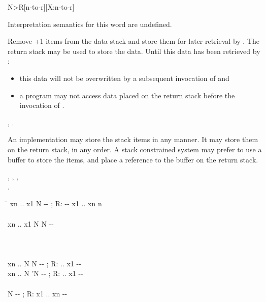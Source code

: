\begin{worddef*}[NtoR]{}{N>R}[n-to-r][X:n-to-r]

\interpret
	Interpretation semantics for this word are undefined.

\execute {} 

	Remove +1 items from the data stack and store them for later
	retrieval by . The return stack may be used to store the
	data. Until this data has been retrieved by :
	\begin{itemize}
	\item this data will not be overwritten by a subsequent invocation of
		 and
	\item a program may not access data placed on the return stack before
		the invocation of .
	\end{itemize} 

\see {},
	  .

	\begin{rationale}
		An implementation may store the stack items in any manner.  It may
		store them on the return stack, in any order.  A stack constrained
		system may prefer to use a buffer to store the items, and place a
		reference to the buffer on the return stack.

	\see {},
	  ,
	  , \\
	  .
	\end{rationale}

	\begin{implement}

		\begin{tabbing}
		\tab \= \tab \= \tab[11] \= \kill
		\word{:}             xn .. x1 N -{}- ; R: -{}- x1 .. xn n \\
		  \+ \\
			 \>\>  xn .. x1 N N -{}- \\
			 \+ \\
				 \- \\
			 \+ \\
				   \word{toR}  \> xn .. N N -{}- ; R: .. x1 -{}- \\
				 \>  xn .. N 'N -{}- ; R: .. x1 -{}- \- \\
		 \\
		 \>\>  N -{}- ; R: x1 .. xn -{}- \\
		  \word{toR}  \- \\
		\word{;}
		\end{tabbing}
	\end{implement}


\end{worddef*}
